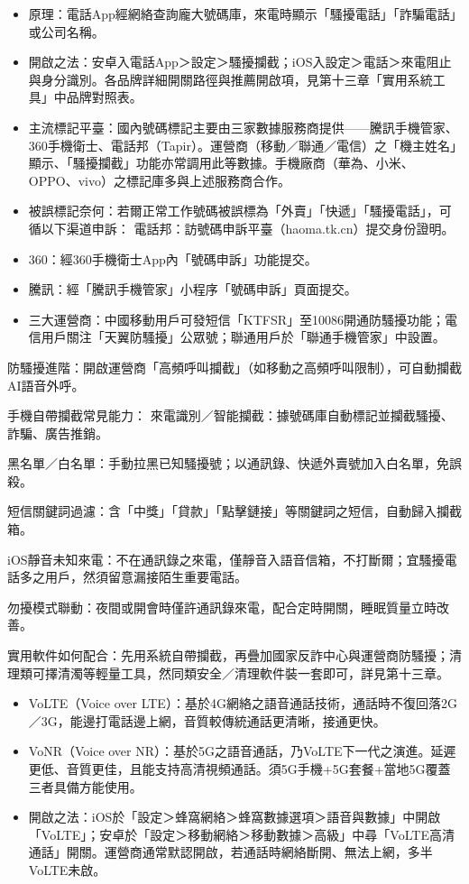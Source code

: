 \begin{itemize}
  \item 原理：電話App經網絡查詢龐大號碼庫，來電時顯示「騷擾電話」「詐騙電話」或公司名稱。
  \item 開啟之法：安卓入電話App＞設定＞騷擾攔截；iOS入設定＞電話＞來電阻止與身分識別。各品牌詳細開關路徑與推薦開啟項，見第十三章「實用系統工具」中品牌對照表。
  \item 主流標記平臺：國內號碼標記主要由三家數據服務商提供——騰訊手機管家、360手機衛士、電話邦（Tapir）。運營商（移動／聯通／電信）之「機主姓名」顯示、「騷擾攔截」功能亦常調用此等數據。手機廠商（華為、小米、OPPO、vivo）之標記庫多與上述服務商合作。
  \item 被誤標記奈何：若爾正常工作號碼被誤標為「外賣」「快遞」「騷擾電話」，可循以下渠道申訴： 電話邦：訪號碼申訴平臺（haoma.tk.cn）提交身份證明。
  \item 360：經360手機衛士App內「號碼申訴」功能提交。
  \item 騰訊：經「騰訊手機管家」小程序「號碼申訴」頁面提交。
  \item 三大運營商：中國移動用戶可發短信「KTFSR」至10086開通防騷擾功能；電信用戶關注「天翼防騷擾」公眾號；聯通用戶於「聯通手機管家」中設置。
\end{itemize}

防騷擾進階：開啟運營商「高頻呼叫攔截」（如移動之高頻呼叫限制），可自動攔截AI語音外呼。

手機自帶攔截常見能力： 來電識別／智能攔截：據號碼庫自動標記並攔截騷擾、詐騙、廣告推銷。

黑名單／白名單：手動拉黑已知騷擾號；以通訊錄、快遞外賣號加入白名單，免誤殺。

短信關鍵詞過濾：含「中獎」「貸款」「點擊鏈接」等關鍵詞之短信，自動歸入攔截箱。

iOS靜音未知來電：不在通訊錄之來電，僅靜音入語音信箱，不打斷爾；宜騷擾電話多之用戶，然須留意漏接陌生重要電話。

勿擾模式聯動：夜間或開會時僅許通訊錄來電，配合定時開關，睡眠質量立時改善。

實用軟件如何配合：先用系統自帶攔截，再疊加國家反詐中心與運營商防騷擾；清理類可擇清濁等輕量工具，然同類安全／清理軟件裝一套即可，詳見第十三章。


\begin{itemize}
  \item VoLTE（Voice over LTE）：基於4G網絡之語音通話技術，通話時不復回落2G／3G，能邊打電話邊上網，音質較傳統通話更清晰，接通更快。
  \item VoNR（Voice over NR）：基於5G之語音通話，乃VoLTE下一代之演進。延遲更低、音質更佳，且能支持高清視頻通話。須5G手機+5G套餐+當地5G覆蓋三者具備方能使用。
  \item 開啟之法：iOS於「設定＞蜂窩網絡＞蜂窩數據選項＞語音與數據」中開啟「VoLTE」；安卓於「設定＞移動網絡＞移動數據＞高級」中尋「VoLTE高清通話」開關。運營商通常默認開啟，若通話時網絡斷開、無法上網，多半VoLTE未啟。
\end{itemize}

